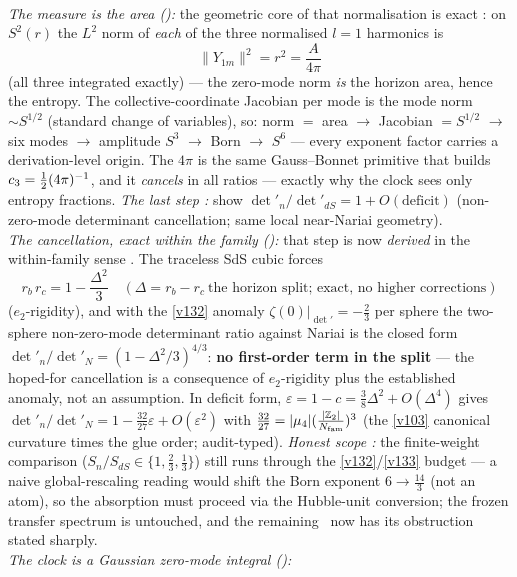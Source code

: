 \smallskip\\
\noindent\emph{The measure is the area ():} the geometric core of
that normalisation is exact \mE: on $S^2(r)$ the $L^2$ norm of \emph{each} of the three normalised
$l{=}1$ harmonics is
\[
  \boxed{\ \|Y_{1m}\|^2=r^2=\frac{A}{4\pi}\ }
\]
(all three integrated exactly) --- the zero-mode norm \emph{is} the horizon area, hence the entropy.
The collective-coordinate Jacobian per mode is the mode norm $\sim S^{1/2}$ (standard change of
variables), so: norm $=$ area $\to$ Jacobian $=S^{1/2}$ $\to$ six modes $\to$ amplitude $S^3$ $\to$
Born $\to$ $S^6$ --- every exponent factor carries a derivation-level origin. The $4\pi$ is the same
Gauss--Bonnet primitive that builds $c_3=\tfrac12(4\pi)^{-1}$, and it \emph{cancels} in all
ratios --- exactly why the clock sees only entropy fractions. \emph{The last step \mC:} show
$\det'_n/\det'_{dS}=1+O(\text{deficit})$ (non-zero-mode determinant cancellation; same local
near-Nariai geometry). 
\smallskip\\
\noindent\emph{The cancellation, exact within the family ():} that step
is now \emph{derived} in the within-family sense \mE. The traceless SdS cubic forces
\[
  \boxed{\ r_b\,r_c=1-\frac{\Delta^2}{3}\quad(\Delta=r_b-r_c\ \text{the horizon split; exact, no higher
  corrections})\ }
\]
($e_2$-rigidity), and with the \vref{v132} anomaly $\zeta(0)|_{\det'}=-\tfrac23$ per sphere the
two-sphere non-zero-mode determinant ratio against Nariai is the closed form
$\det'_n/\det'_N=(1-\Delta^2/3)^{4/3}$: \textbf{no first-order term in the split} --- the hoped-for
cancellation is a consequence of $e_2$-rigidity plus the established anomaly, not an assumption. In
deficit form, $\varepsilon=1-c=\tfrac38\Delta^2+O(\Delta^4)$ gives
$\det'_n/\det'_N=1-\tfrac{32}{27}\varepsilon+O(\varepsilon^2)$ with
$\tfrac{32}{27}=|\mu_4|(\tfrac{|\mathbb{Z}_2|}{N_{\mathrm{fam}}})^3$ (the \vref{v103} canonical curvature times the glue
order; audit-typed). \emph{Honest scope \mC:} the finite-weight comparison
($S_n/S_{dS}\in\{1,\tfrac23,\tfrac13\}$) still runs through the \vref{v132}/\vref{v133} budget --- a naive
global-rescaling reading would shift the Born exponent $6\to\tfrac{14}3$ (not an atom), so the absorption
must proceed via the Hubble-unit conversion; the frozen transfer spectrum is untouched, and the remaining
\mC\ now has its obstruction stated sharply.
\smallskip\\
\noindent\emph{The clock is a Gaussian zero-mode integral ():}
